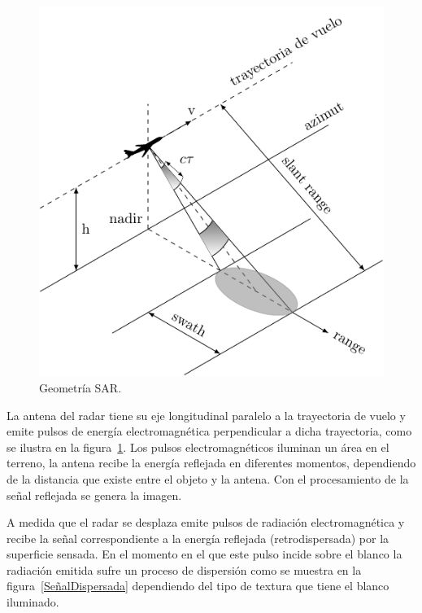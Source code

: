 \begin{figure}[hbt]
	\centering    
	\includegraphics[scale=1]{../../Figures/Tesis/Capitulo3/sar_3d.pdf}
	\caption{\label{GeometriaSAR}Geometría SAR.} %
\end{figure} 

La antena del radar tiene su eje longitudinal paralelo a la trayectoria de vuelo y emite pulsos de energía electromagnética perpendicular a dicha trayectoria, como se ilustra en la figura~\ref{GeometriaSAR}. Los pulsos electromagnéticos iluminan un área en el terreno, la antena recibe la energía reflejada en diferentes momentos, dependiendo de la distancia que existe entre el objeto y la antena. Con  el procesamiento de la señal reflejada se genera la imagen. 

A medida que el radar se desplaza emite pulsos de radiación electromagnética y recibe la señal correspondiente a la energía reflejada (retrodispersada)  por la superficie sensada. En el momento en el que este pulso incide sobre el blanco la radiación emitida sufre un proceso de dispersión como se muestra en la figura~\ref{SeñalDispersada} dependiendo del tipo de textura que tiene el blanco iluminado. 

